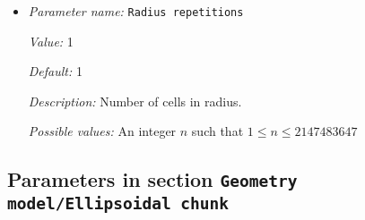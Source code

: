 \begin{itemize}
{\it Value:} 1


{\it Default:} 1


{\it Description:} Number of cells in longitude.


{\it Possible values:} An integer $n$ such that $1\leq n \leq 2147483647$
\item {\it Parameter name:} {\tt Radius repetitions}
\label{parameters:Geometry model/Chunk/Radius repetitions}
\label{parameters:Geometry_20model/Chunk/Radius_20repetitions}


{\it Value:} 1


{\it Default:} 1


{\it Description:} Number of cells in radius.


{\it Possible values:} An integer $n$ such that $1\leq n \leq 2147483647$
\end{itemize}

\subsection{Parameters in section \tt Geometry model/Ellipsoidal chunk}
\label{parameters:Geometry_20model/Ellipsoidal_20chunk}


